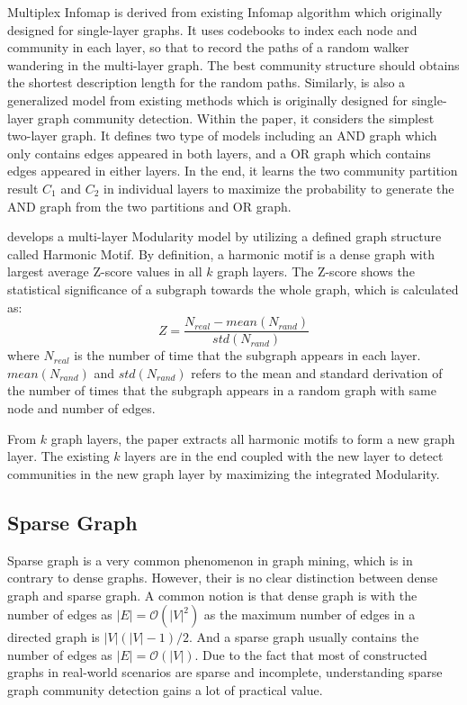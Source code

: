 Multiplex Infomap \cite{de2015identifying} is derived from existing Infomap algorithm which originally designed for single-layer graphs. It uses codebooks to index each node and community in each layer, so that to record the paths of a random walker wandering in the multi-layer graph. The best community structure should obtains the shortest description length for the random paths. Similarly, \cite{valles2016multilayer} is also a generalized model from existing methods which is originally designed for single-layer graph community detection. Within the paper, it considers the simplest two-layer graph. It defines two type of models including an AND graph which only contains edges appeared in both layers, and a OR graph which contains edges appeared in either layers. In the end, it learns the two community partition result $C_1$ and $C_2$ in individual layers to maximize the probability to generate the AND graph from the two partitions and OR graph. 

\cite{huang2018harmonic} develops a multi-layer Modularity model by utilizing a defined graph structure called Harmonic Motif. By definition, a harmonic motif is a dense graph with largest average Z-score values in all $k$ graph layers. The Z-score shows the statistical significance of a subgraph towards the whole graph, which is calculated as:
\begin{equation}
Z = \frac{N_{real}- mean(N_{rand})}{std(N_{rand})}
\end{equation}
where $N_{real}$ is the number of time that the subgraph appears in each layer. $mean(N_{rand})$ and $std(N_{rand})$ refers to the mean and standard derivation of the number of times that the subgraph appears in a random graph with same node and number of edges.

From $k$ graph layers, the paper extracts all harmonic motifs to form a new graph layer. The existing $k$ layers are in the end coupled with the new layer to detect communities in the new graph layer by maximizing the integrated Modularity. 

\subsection{Sparse Graph}
Sparse graph is a very common phenomenon in graph mining, which is in contrary to dense graphs. However, their is no clear distinction between dense graph and sparse graph. A common notion is that dense graph is with the number of edges as $|E| = \mathcal{O}(|V|^2)$ as the maximum number of edges in a directed graph is $|V|(|V|-1)/2$. And a sparse graph usually contains the number of edges as $|E| = \mathcal{O}(|V|)$. Due to the fact that most of constructed graphs in real-world scenarios are sparse and incomplete, understanding sparse graph community detection gains a lot of practical value. 

